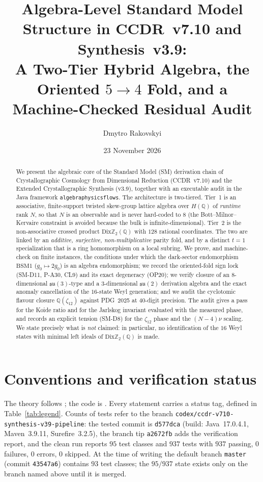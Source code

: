 \documentclass[11pt,a4paper]{article}
\title{Algebra-Level Standard Model Structure in CCDR~v7.10 and Synthesis~v3.9:\\
A Two-Tier Hybrid Algebra, the Oriented $5\to4$ Fold, and a Machine-Checked Residual Audit}
\author{Dmytro Rakovskyi}
\date{23 November 2026}
\theoremstyle{definition}
\theoremstyle{remark}
\newcommand{\DZ}{\mathrm{Dix}\mathbb{Z}_2(\mathbb{Q})}
\newcommand{\code}[1]{\texttt{#1}}
\begin{document}
\maketitle

\begin{abstract}
We present the algebraic core of the Standard Model (SM) derivation chain of Crystallographic Cosmology from Dimensional Reduction (CCDR~v7.10) and the Extended Crystallographic Synthesis (v3.9), together with an executable audit in the Java framework \code{algebraphysicsflows}. The architecture is two-tiered. Tier~1 is an associative, finite-support twisted skew-group lattice algebra over $H(\mathbb{Q})$ of \emph{runtime} rank $N$, so that $N$ is an observable and is never hard-coded to $8$ (the Bott--Milnor--Kervaire constraint is avoided because the bulk is infinite-dimensional). Tier~2 is the non-associative crossed product $\DZ$ with $128$ rational coordinates. The two are linked by an \emph{additive, surjective, non-multiplicative} parity fold, and by a distinct $t=1$ specialization that is a ring homomorphism on a local subring. We prove, and machine-check on finite instances, the conditions under which the dark-sector endomorphism $\mathrm{BSM1}$ ($g_0\mapsto 2g_0$) is an algebra endomorphism; we record the oriented-fold sign lock (SM-D11, P-A30, CL9) and its exact degeneracy (OP20); we verify closure of an $8$-dimensional $\mathfrak{su}(3)$-type and a $3$-dimensional $\mathfrak{su}(2)$ derivation algebra and the exact anomaly cancellation of the $16$-state Weyl generation; and we audit the cyclotomic flavour closure $\mathbb{Q}(\zeta_{12})$ against PDG~2025 at 40-digit precision. The audit gives a pass for the Koide ratio and for the Jarlskog invariant evaluated with the measured phase, and records an explicit tension (SM-D8) for the $\zeta_{12}$ phase and the $(N-4)\nu$ scaling. We state precisely what is \emph{not} claimed: in particular, no identification of the $16$ Weyl states with minimal left ideals of $\DZ$ is made.
\end{abstract}

\section*{Conventions and verification status}
The theory follows \cite{CCDR}; the code is \cite{Repo}. 
Every statement carries a status tag, defined in Table~\ref{tab:legend}. Counts of tests refer to the branch \code{codex/ccdr-v710-synthesis-v39-pipeline}: the tested commit is \code{d577dca} (build: Java~17.0.4.1, Maven~3.9.11, Surefire~3.2.5), the branch tip \code{a2672fb} adds the verification report, and the clean run reports $95$ test classes and $937$ tests with $937$ passing, $0$ failures, $0$ errors, $0$ skipped. At the time of writing the default branch \code{master} (commit \code{43547a6}) contains $93$ test classes; the $95/937$ state exists only on the branch named above until it is merged.
\end{document}

